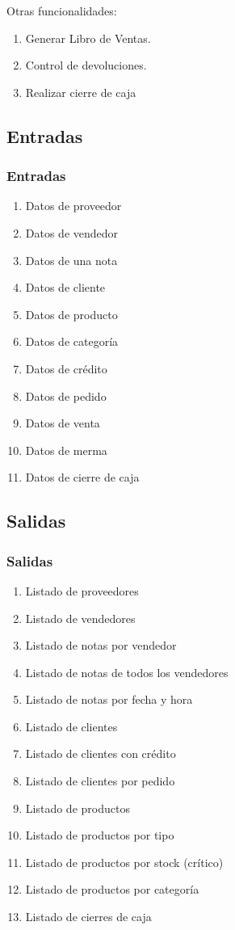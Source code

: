 \documentclass{beamer}
\begin{document}
\begin{frame}
Otras funcionalidades:
\begin{enumerate}
\item Generar Libro de Ventas.
\item Control de devoluciones.
\item Realizar cierre de caja
\end{enumerate}
\end{frame}

\subsection{Entradas}

\begin{frame}
\frametitle{Entradas}
\begin{enumerate}
\item Datos de proveedor
\item Datos de vendedor
\item Datos de una nota
\item Datos de cliente
\item Datos de producto
\item Datos de categoría
\item Datos de crédito
\item Datos de pedido
\item Datos de venta
\item Datos de merma
\item Datos de cierre de caja
\end{enumerate}
\end{frame}

\subsection{Salidas}

\begin{frame}
\frametitle{Salidas}
\begin{enumerate}
\item Listado de proveedores
\item Listado de vendedores
\item Listado de notas por vendedor
\item Listado de notas de todos los vendedores
\item Listado de notas por fecha y hora
\item Listado de clientes
\item Listado de clientes con crédito
\item Listado de clientes por pedido
\item Listado de productos
\item Listado de productos por tipo
\item Listado de productos por stock (crítico)
\item Listado de productos por categoría
\item Listado de cierres de caja
\end{enumerate}
\end{frame}
\end{document}
